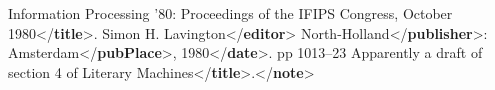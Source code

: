 \begin{shaded}
\hspace*{1em}Information Processing '80:\mbox{}\newline 
\hspace*{1em}\hspace*{1em}\hspace*{1em}\hspace*{1em}\hspace*{1em}\hspace*{1em} Proceedings of the IFIPS Congress, October 1980{</\textbf{title}>}.\mbox{}\newline 
\hspace*{1em}Simon H. Lavington{</\textbf{editor}>}\mbox{}\newline 
\hspace*{1em}\hspace*{1em}North-Holland{</\textbf{publisher}>}:\mbox{}\newline 
\hspace*{1em}Amsterdam{</\textbf{pubPlace}>},\mbox{}\newline 
\hspace*{1em}1980{</\textbf{date}>}.\mbox{}\newline 
\hspace*{1em}pp 1013–23\mbox{}\newline 
\hspace*{1em}\hspace*{1em}\mbox{}\newline 
\hspace*{1em}\hspace*{1em}Apparently a draft of section 4 of\mbox{}\newline 
\hspace*{1em}\hspace*{1em}Literary Machines{</\textbf{title}>}.{</\textbf{note}>}\mbox{}\newline 

\end{shaded}
